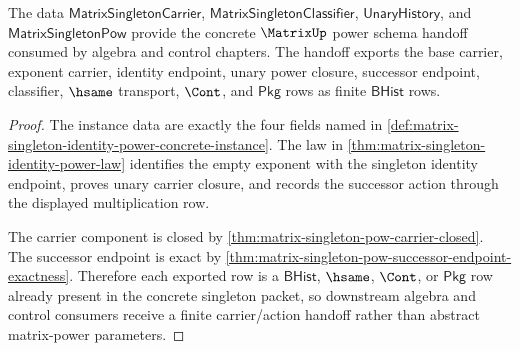 \begin{theorem}
\label{thm:matrix-singleton-identity-power-schema-handoff}
The data
$\mathsf{MatrixSingletonCarrier}$, $\mathsf{MatrixSingletonClassifier}$,
$\mathsf{UnaryHistory}$, and $\mathsf{MatrixSingletonPow}$ provide the concrete
$\MatrixUp$ power schema handoff consumed by algebra and control chapters. The
handoff exports the base carrier, exponent carrier, identity endpoint, unary
power closure, successor endpoint, classifier, $\hsame$ transport, $\Cont$, and
$\mathsf{Pkg}$ rows as finite $\mathsf{BHist}$ rows.
\end{theorem}
\begin{proof}
The instance data are exactly the four fields named in
\autoref{def:matrix-singleton-identity-power-concrete-instance}. The law in
\autoref{thm:matrix-singleton-identity-power-law} identifies the empty exponent
with the singleton identity endpoint, proves unary carrier closure, and records
the successor action through the displayed multiplication row.

The carrier component is closed by
\autoref{thm:matrix-singleton-pow-carrier-closed}. The successor endpoint is
exact by
\autoref{thm:matrix-singleton-pow-successor-endpoint-exactness}. Therefore each
exported row is a $\mathsf{BHist}$, $\hsame$, $\Cont$, or $\mathsf{Pkg}$ row
already present in the concrete singleton packet, so downstream algebra and
control consumers receive a finite carrier/action handoff rather than abstract
matrix-power parameters.
\end{proof}
